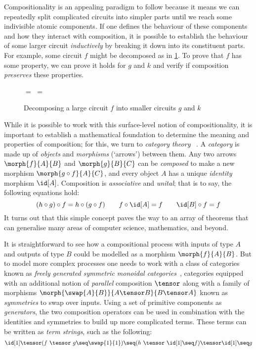 Compositionality is an appealing paradigm to follow because it means we can
repeatedly split complicated circuits into simpler parts until we reach some
indivisible atomic components.
If one defines the behaviour of these components and how they interact
with composition, it is possible to establish the behaviour of some
larger circuit \emph{inductively} by breaking it down into its
constituent parts.
For example, some circuit \(f\) might be decomposed as in
\cref{fig:decomposition}.
To prove that \(f\) has some property, we can prove it holds for \(g\) and \(k\)
and verify if composition \emph{preserves} these properties.

\begin{figure}
    \centering
    \(=\)
    \(=\)
    \caption{
        Decomposing a large circuit \(f\) into smaller circuits \(g\)
        and \(k\)
    }
    \label{fig:decomposition}
\end{figure}

While it is possible to work with this surface-level notion of
compositionality, it is important to establish a mathematical
foundation to determine the meaning and properties of composition; for this, we
turn to \emph{category theory}~\cite{maclane1978categories}
.
A \emph{category} is made up of \emph{objects} and \emph{morphisms} (`arrows')
between them.
Any two arrows \(\morph{f}{A}{B}\) and \(\morph{g}{B}{C}\) can be
\emph{composed} to  make a new morphism \(\morph{g \circ f}{A}{C}\), and every
object \(A\) has a unique \emph{identity} morphism \(\id[A]\).
Composition is \emph{associative} and \emph{unital}; that is to say, the
following equations hold:
\[
    (h \circ g) \circ f = h \circ (g \circ f)
    \qquad
    f \circ \id[A] = f
    \qquad
    \id[B] \circ f = f
\]
It turns out that this simple concept paves the way to an array of
theorems that can generalise many areas of computer science, mathematics, and
beyond.

It is straightforward to see how a compositional process with inputs of type
\(A\) and outputs of type \(B\) could be modelled as a morphism
\(\morph{f}{A}{B}\).
But to model more complex processes one needs to work with a class of categories
known as
\emph{freely generated symmetric monoidal categories}~\cite{maclane1963natural},
categories equipped with an additional notion of \emph{parallel} composition
\(\tensor\) along with a family of morphisms
\(\morph{\swap{A}{B}}{A\tensor B}{B \tensor A}\) known as \emph{symmetries} to
swap over inputs.
Using a set of primitive components as \emph{generators}, the two composition
operators can be used in combination with the identities and symmetries to build
up more complicated terms.
These terms can be written as \emph{term strings}, such as the following:
\[
    \id[1]
    \tensor
    (f\ \tensor\ g
    \seq
    \swap{1}{1}
    )
    \seq
    (h\ \tensor\ \id[1] \seq f)
    \tensor
    \id[1]
    \seq
    g
\]

